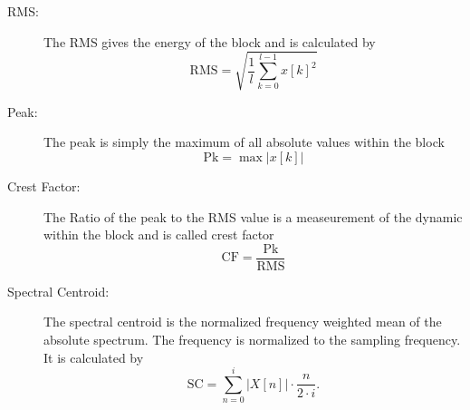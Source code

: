 \begin{description}
    \item[RMS:]
        The RMS gives the energy of the block and is calculated by
        \[
            \mathrm{RMS} = \sqrt{\frac{1}{l}\sum_{k=0}^{l-1}{x[k]^2}}
        \]
    \item[Peak:]
        The peak is simply the maximum of all absolute values within the block
        \[
            \mathrm{Pk} = \max{|x[k]|}
        \]
    \item[Crest Factor:]
        The Ratio of the peak to the RMS value is a measeurement of the dynamic within the block and is called crest factor
        \[
            \mathrm{CF} = \frac{\mathrm{Pk}}{\mathrm{RMS}}
        \]
    \item[Spectral Centroid:]
        The spectral centroid is the normalized frequency weighted mean of the absolute spectrum. The frequency is normalized to the sampling frequency. It is calculated by
        \[
            \mathrm{SC} = \sum_{n=0}^{i}{|X[n]| \cdot \frac{n}{2 \cdot i}}.
        \]
        

\end{description}
